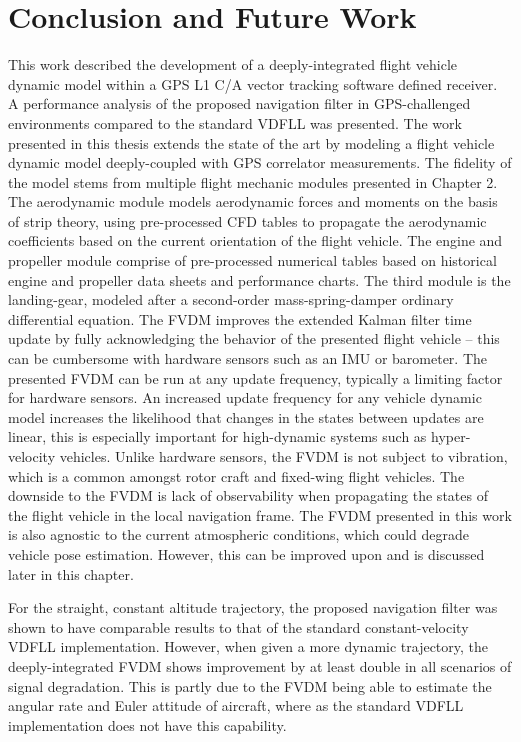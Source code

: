 \chapter{Conclusion and Future Work}
This work described the development of a deeply-integrated flight vehicle dynamic model within a GPS L1 C/A vector tracking software defined receiver. A performance analysis of the proposed navigation filter in GPS-challenged environments compared to the standard VDFLL was presented. The work presented in this thesis extends the state of the art by modeling a flight vehicle dynamic model deeply-coupled with GPS correlator measurements. The fidelity of the model stems from multiple flight mechanic modules presented in Chapter 2. The aerodynamic module models aerodynamic forces and moments on the basis of strip theory, using pre-processed CFD tables to propagate the aerodynamic coefficients based on the current orientation of the flight vehicle. The engine and propeller module comprise of pre-processed numerical tables based on historical engine and propeller data sheets and performance charts. The third module is the landing-gear, modeled after a second-order mass-spring-damper ordinary differential equation. The FVDM improves the extended Kalman filter time update by fully acknowledging the behavior of the presented flight vehicle {--} this can be cumbersome with hardware sensors such as an IMU or barometer. The presented FVDM can be run at any update frequency, typically a limiting factor for hardware sensors. An increased update frequency for any vehicle dynamic model increases the likelihood that changes in the states between updates are linear, this is especially important for high-dynamic systems such as hyper-velocity vehicles. Unlike hardware sensors, the FVDM is not subject to vibration, which is a common amongst rotor craft and fixed-wing flight vehicles. The downside to the FVDM is lack of observability when propagating the states of the flight vehicle in the local navigation frame. The FVDM presented in this work is also agnostic to the current atmospheric conditions, which could degrade vehicle pose estimation. However, this can be improved upon and is discussed later in this chapter.

For the straight, constant altitude trajectory, the proposed navigation filter was shown to have comparable results to that of the standard constant-velocity VDFLL implementation. However, when given a more dynamic trajectory, the deeply-integrated FVDM shows improvement by at least double in all scenarios of signal degradation. This is partly due to the FVDM being able to estimate the angular rate and Euler attitude of aircraft, where as the standard VDFLL implementation does not have this capability.

